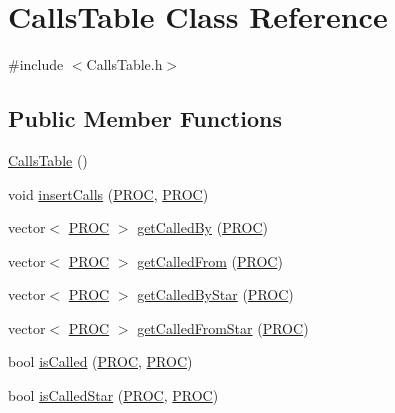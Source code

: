 \hypertarget{class_calls_table}{\section{Calls\-Table Class Reference}
\label{class_calls_table}
}


{\ttfamily \#include $<$Calls\-Table.\-h$>$}

\subsection*{Public Member Functions}
\begin{DoxyCompactItemize}
\item 
\hyperlink{class_calls_table_a852d1327bef61851b3896264b682a4aa}{Calls\-Table} ()
\item 
void \hyperlink{class_calls_table_a8a0b0e665281f2c0d23f255c03282a66}{insert\-Calls} (\hyperlink{std_afx_8h_aa07ea1d188c7b45668f1bd82ffd6d87e}{P\-R\-O\-C}, \hyperlink{std_afx_8h_aa07ea1d188c7b45668f1bd82ffd6d87e}{P\-R\-O\-C})
\item 
vector$<$ \hyperlink{std_afx_8h_aa07ea1d188c7b45668f1bd82ffd6d87e}{P\-R\-O\-C} $>$ \hyperlink{class_calls_table_af50654db975ad7d3b9fa74f8547998eb}{get\-Called\-By} (\hyperlink{std_afx_8h_aa07ea1d188c7b45668f1bd82ffd6d87e}{P\-R\-O\-C})
\item 
vector$<$ \hyperlink{std_afx_8h_aa07ea1d188c7b45668f1bd82ffd6d87e}{P\-R\-O\-C} $>$ \hyperlink{class_calls_table_ade7109a5b16d953b66c49ddeef36eff1}{get\-Called\-From} (\hyperlink{std_afx_8h_aa07ea1d188c7b45668f1bd82ffd6d87e}{P\-R\-O\-C})
\item 
vector$<$ \hyperlink{std_afx_8h_aa07ea1d188c7b45668f1bd82ffd6d87e}{P\-R\-O\-C} $>$ \hyperlink{class_calls_table_a71e96fb0576531152756c529c0bb666f}{get\-Called\-By\-Star} (\hyperlink{std_afx_8h_aa07ea1d188c7b45668f1bd82ffd6d87e}{P\-R\-O\-C})
\item 
vector$<$ \hyperlink{std_afx_8h_aa07ea1d188c7b45668f1bd82ffd6d87e}{P\-R\-O\-C} $>$ \hyperlink{class_calls_table_a3f984929213fdd181d904a9bcd8b99c2}{get\-Called\-From\-Star} (\hyperlink{std_afx_8h_aa07ea1d188c7b45668f1bd82ffd6d87e}{P\-R\-O\-C})
\item 
bool \hyperlink{class_calls_table_a7533cb25ac6b5cfa990a4ab66caa7d84}{is\-Called} (\hyperlink{std_afx_8h_aa07ea1d188c7b45668f1bd82ffd6d87e}{P\-R\-O\-C}, \hyperlink{std_afx_8h_aa07ea1d188c7b45668f1bd82ffd6d87e}{P\-R\-O\-C})
\item 
bool \hyperlink{class_calls_table_a8355c71d51e270130651f17007d3b6a6}{is\-Called\-Star} (\hyperlink{std_afx_8h_aa07ea1d188c7b45668f1bd82ffd6d87e}{P\-R\-O\-C}, \hyperlink{std_afx_8h_aa07ea1d188c7b45668f1bd82ffd6d87e}{P\-R\-O\-C})

\end{DoxyCompactItemize}
